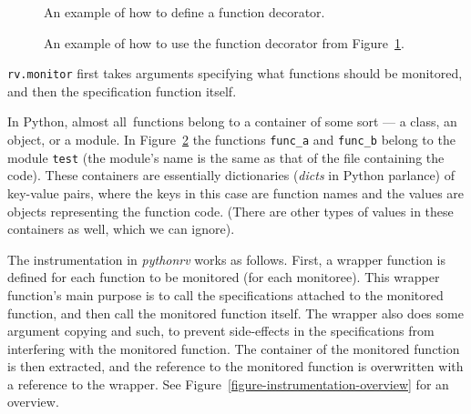 \documentclass[a4paper,11pt]{kth-mag}
\theoremstyle{definition}
\begin{document}
\begin{figure}[h!]
	\begin{center}
	\begin{minipage}{0.7\textwidth}
	
	\end{minipage}
	\end{center}

	\caption{An example of how to define a function decorator.}
	\label{figure-function-decorator}
\end{figure}

\begin{figure}[h!]
	\begin{center}
	\begin{minipage}{0.7\textwidth}
	
	\end{minipage}
	\end{center}

	\caption{An example of how to use the function decorator from
	Figure~\ref{figure-function-decorator}.}
	\label{figure-function-decorator-usages}
\end{figure}

\texttt{rv.monitor} first takes arguments specifying what functions should be
monitored, and then the specification function itself.

In Python, almost all\footnotemark\ functions belong to a container of some
sort --- a class, an object, or a module. In
Figure~\ref{figure-function-decorator-usages} the functions \texttt{func\_a}
and \texttt{func\_b} belong to the module \texttt{test} (the module's name is
the same as that of the file containing the code). These containers are
essentially dictionaries (\textit{dicts} in Python parlance) of key-value
pairs, where the keys in this case are function names and the values are
objects representing the function code. (There are other types of values in
these containers as well, which we can ignore).


The instrumentation in \textit{pythonrv} works as follows. First, a wrapper
function is defined for each function to be monitored (for each monitoree).
This wrapper function's main purpose is to call the specifications attached to
the monitored function, and then call the monitored function itself. The
wrapper also does some argument copying and such, to prevent side-effects in
the specifications from interfering with the monitored function. The container
of the monitored function is then extracted, and the reference to the monitored
function is overwritten with a reference to the wrapper. See
Figure~\ref{figure-instrumentation-overview} for an overview.
\end{document}
